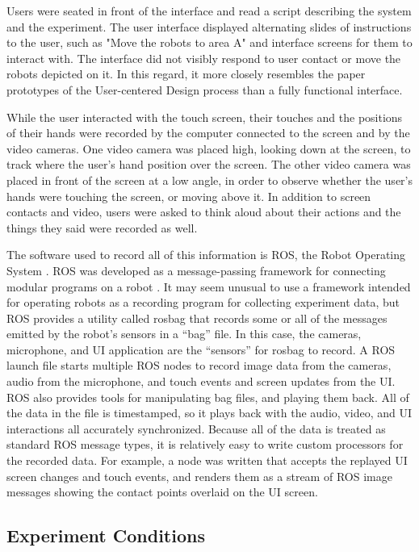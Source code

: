 \documentclass[]{article}
\begin{document}
Users were seated in front of the interface and read a script describing the system and the experiment. The user interface displayed alternating slides of instructions to the user, such as "Move the robots to area A" and interface screens for them to interact with. 
The interface did not visibly respond to user contact or move the robots depicted on it.
In this regard, it more closely resembles the paper prototypes of the User-centered Design process  than a fully functional interface.

While the user interacted with the touch screen, their touches and the positions of their hands were recorded by the computer connected to the screen and by the video cameras. 
One video camera was placed high, looking down at the screen, to track where the user's hand position over the screen. 
The other video camera was placed in front of the screen at a low angle, in order to observe whether the user's hands were touching the screen, or moving above it. 
In addition to screen contacts and video, users were asked to think aloud about their actions and the things they said were recorded as well. 

The software used to record all of this information is ROS, the Robot Operating System . 
ROS was developed as a message-passing framework for connecting modular programs on a robot . 
It may seem unusual to use a framework intended for operating robots as a recording program for collecting experiment data, but ROS provides a utility called rosbag that records some or all of the messages emitted by the robot's sensors in a ``bag'' file. 
In this case, the cameras, microphone, and UI application are the ``sensors'' for rosbag to record.
A ROS launch file starts multiple ROS nodes to record image data from the cameras, audio from the microphone, and touch events and screen updates from the UI.
ROS also provides tools for manipulating bag files, and playing them back. 
All of the data in the file is timestamped, so it plays back with the audio, video, and UI interactions all accurately synchronized. 
Because all of the data is treated as standard ROS message types, it is relatively easy to write custom processors for the recorded data.
For example, a node was written that accepts the replayed UI screen changes and touch events, and renders them as a stream of ROS image messages showing the contact points overlaid on the UI screen. 

\subsection{Experiment Conditions}
\end{document}
